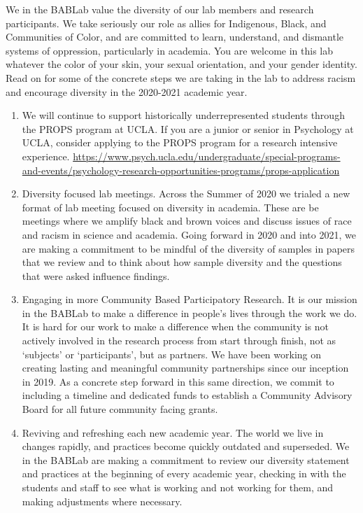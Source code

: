 \documentclass[]{book}
\begin{document}
We in the BABLab value the diversity of our lab members and research participants. We take seriously our role as allies for Indigenous, Black, and Communities of Color, and are committed to learn, understand, and dismantle systems of oppression, particularly in academia. You are welcome in this lab whatever the color of your skin, your sexual orientation, and your gender identity. Read on for some of the concrete steps we are taking in the lab to address racism and encourage diversity in the 2020-2021 academic year.

\begin{enumerate}
\def\labelenumi{\arabic{enumi}.}
\item
  We will continue to support historically underrepresented students through the PROPS program at UCLA.
  If you are a junior or senior in Psychology at UCLA, consider applying to the PROPS program for a research intensive experience. \url{https://www.psych.ucla.edu/undergraduate/special-programs-and-events/psychology-research-opportunities-programs/props-application}
\item
  Diversity focused lab meetings.
  Across the Summer of 2020 we trialed a new format of lab meeting focused on diversity in academia. These are be meetings where we amplify black and brown voices and discuss issues of race and racism in science and academia. Going forward in 2020 and into 2021, we are making a commitment to be mindful of the diversity of samples in papers that we review and to think about how sample diversity and the questions that were asked influence findings.
\item
  Engaging in more Community Based Participatory Research.
  It is our mission in the BABLab to make a difference in people's lives through the work we do. It is hard for our work to make a difference when the community is not actively involved in the research process from start through finish, not as `subjects' or `participants', but as partners. We have been working on creating lasting and meaningful community partnerships since our inception in 2019. As a concrete step forward in this same direction, we commit to including a timeline and dedicated funds to establish a Community Advisory Board for all future community facing grants.
\item
  Reviving and refreshing each new academic year.
  The world we live in changes rapidly, and practices become quickly outdated and superseded. We in the BABLab are making a commitment to review our diversity statement and practices at the beginning of every academic year, checking in with the students and staff to see what is working and not working for them, and making adjustments where necessary.
\end{enumerate}
\end{document}
